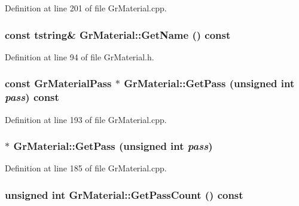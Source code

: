 \begin{CompactItemize}
Definition at line 201 of file GrMaterial.cpp.\hypertarget{class_gr_material_f795daba144a86beb2d2baa22bc69b44}{
\subsubsection[{GetName}]{\setlength{\rightskip}{0pt plus 5cm}const {\bf tstring}\& GrMaterial::GetName () const}}
\label{class_gr_material_f795daba144a86beb2d2baa22bc69b44}




Definition at line 94 of file GrMaterial.h.\hypertarget{class_gr_material_8be12969be7c362332fe9ccf19b0c367}{
\subsubsection[{GetPass}]{\setlength{\rightskip}{0pt plus 5cm}const {\bf GrMaterialPass} $\ast$ GrMaterial::GetPass (unsigned int {\em pass}) const}}
\label{class_gr_material_8be12969be7c362332fe9ccf19b0c367}




Definition at line 193 of file GrMaterial.cpp.\hypertarget{class_gr_material_d1d9f753c4b3875f7d2b361bcf8cf99a}{
\subsubsection[{GetPass}]{ $\ast$ GrMaterial::GetPass (unsigned int {\em pass})}}
\label{class_gr_material_d1d9f753c4b3875f7d2b361bcf8cf99a}




Definition at line 185 of file GrMaterial.cpp.\hypertarget{class_gr_material_c5afd8886b80a26cb67430eb48ba8bf7}{
\subsubsection[{GetPassCount}]{\setlength{\rightskip}{0pt plus 5cm}unsigned int GrMaterial::GetPassCount () const}}
\label{class_gr_material_c5afd8886b80a26cb67430eb48ba8bf7}





\end{CompactItemize}
